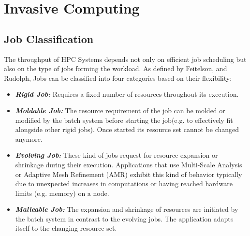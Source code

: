 \chapter{Invasive Computing}\label{chapter:invasive computing}
\section{Job Classification}
The throughput of HPC Systems depends not only on efficient job scheduling but also on the type of jobs forming the workload. As defined by Feitelson, and Rudolph, Jobs can be classified into four categories based on their flexibility:
\begin{itemize}
\item \textbf{\textit{Rigid Job:}} Requires a fixed number of resources throughout its execution.
\item \textbf{\textit{Moldable Job: }} The resource requirement of the job can be molded or modified by the batch system before starting the job(e.g. to effectively fit alongside other rigid jobs). Once started its resource set cannot be changed anymore.
\item \textbf{\textit{Evolving Job: }} These kind of jobs request for resource expansion or shrinkage during their execution. Applications that use Multi-Scale Analysis or Adaptive Mesh Refinement (AMR) exhibit this kind of behavior typically due to unexpected increases in computations or having reached hardware limits (e.g. memory) on a node.
\item \textbf{\textit{Malleable Job: }} The expansion and shrinkage of resources are initiated by the batch system in contrast to the evolving jobs. The application adapts itself to the changing resource set.
\end{itemize}

